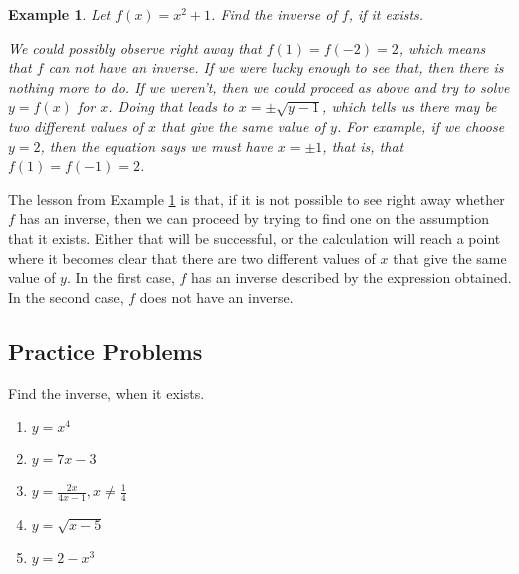 \documentclass[11pt]{book}               %
\newtheorem{example}{Example}
\begin{document}
\begin{example}
Let $f(x) = x^2 + 1$.  Find the inverse of $f$, if it exists.

\normalfont
We could possibly observe right away that $f(1) = f(-2) = 2$, which means that $f$ can not have an inverse.
If we were lucky enough to see that, then there is nothing more to do.
If we weren't, then we could proceed as above and try to solve $y = f(x)$ for $x$.
Doing that leads to $x =  \pm \sqrt{y-1}$, which tells us there may be two different values of $x$ 
that give the same value of $y$.  For example, if we choose $y = 2$, then the equation says 
we must have $x = \pm 1$, that is, that $f(1) = f(-1) = 2$.

\label{ex5.3}
\end{example}


The lesson from  Example \ref{ex5.3} is that, if it is not possible to see right away whether $f$ has an inverse, 
then we can proceed by trying to find one on the assumption that it exists.
Either that will be successful, or the calculation will reach a point where 
it becomes clear that there are two different values of $x$ 
that give the same value of $y$.
In the first case, $f$ has an inverse described by the expression obtained.
In the second case, $f$ does not have an inverse.

%
%



\newpage
\subsection{Practice Problems}
Find the inverse, when it exists.
\begin{enumerate}
\item $ y=x^4$ 
\item $  y=7x-3$ 
\item $y = \frac{2x}{4x-1}, x \neq \frac{1}{4} $ 
\item $y=\sqrt{x-5} $ 
\item $y=2-x^3 $ 
\end{enumerate}
\end{document}
